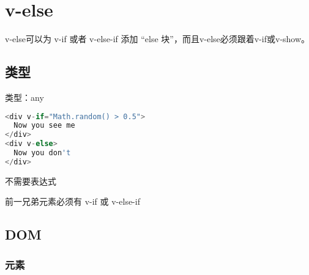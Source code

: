 \begin{lstlisting}[language=JavaScript]

\end{lstlisting}




\begin{lstlisting}[language=JavaScript]

\end{lstlisting}




\begin{lstlisting}[language=JavaScript]

\end{lstlisting}




\begin{lstlisting}[language=JavaScript]

\end{lstlisting}

\section{v-else}

v-else可以为 v-if 或者 v-else-if 添加 “else 块”，而且v-else必须跟着v-if或v-show。


\subsection{类型}

\begin{compactitem}
\item 类型：any
\end{compactitem}


\begin{lstlisting}[language=JavaScript]
<div v-if="Math.random() > 0.5">
  Now you see me
</div>
<div v-else>
  Now you don't
</div>
\end{lstlisting}

\begin{compactitem}
\item 不需要表达式
\item 前一兄弟元素必须有 v-if 或 v-else-if
\end{compactitem}


\subsection{DOM}

\subsubsection{元素}


